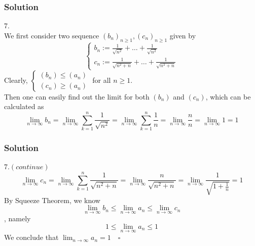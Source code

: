 \documentclass{beamer}
\begin{document}
\begin{frame}
    \frametitle{Solution}
7.\\
\hspace{1em} We first consider two sequence $(b_n)_{n\geq 1},(c_n)_{n\geq 1}$ given by 
\begin{equation*}
    \begin{cases}
        b_n:=\frac{1}{\sqrt{n^2}}+\dots+\frac{1}{\sqrt{n^2}}\\
        c_n:=\frac{1}{\sqrt{n^2+n}}+\dots+\frac{1}{\sqrt{n^2+n}}
    \end{cases}
\end{equation*}
\hspace{1em} Clearly, 
$\begin{cases}
    (b_n)\leq (a_n)\\
    (c_n)\geq (a_n)
\end{cases}$ 
for all $n\geq 1$. \\
\hspace{1em} Then one can easily find out the limit for both $(b_n)$ and $(c_n)$, which can be calculated as 
\begin{equation*}
    \lim_{n\rightarrow\infty}b_n=\lim_{n\rightarrow \infty}\sum^n_{k=1}\frac{1}{\sqrt{n^2}}=\lim_{n\rightarrow \infty}\sum^n_{k=1}\frac{1}{n}=\lim_{n\rightarrow\infty}\frac{n}{n}=\lim_{n\rightarrow\infty}1=1
\end{equation*}
\end{frame}

\begin{frame}
    \frametitle{Solution}
7.$(continue)$\\
\begin{equation*}
    \lim_{n\rightarrow\infty}c_n=\lim_{n\rightarrow \infty}\sum^n_{k=1}\frac{1}{\sqrt{n^2+n}}=\lim_{n\rightarrow \infty}\frac{n}{\sqrt{n^2+n}}=\lim_{n\rightarrow\infty}\frac{1}{\sqrt{1+\frac{1}{n}}}=1
\end{equation*}
\hspace{1em} By Squeeze Theorem, we know 
\begin{equation*}
    \lim_{n\rightarrow\infty}b_n\leq \lim_{n\rightarrow\infty}a_n\leq \lim_{n\rightarrow\infty}c_n
\end{equation*}
, namely
\begin{equation*}
    1\leq \lim_{n\rightarrow\infty}a_n\leq1
\end{equation*}
We conclude that $ \lim_{n\rightarrow\infty}a_n=1\quad\square$
\end{frame}
\end{document}
